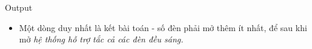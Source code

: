 Output
\begin{itemize}
	\item Một dòng duy nhất là kết bài toán - số đèn phải mở thêm ít nhất, để sau khi mở \emph{ hệ thống hỗ trợ }\emph{ tắc cả các đèn đều sáng. }
\end{itemize}